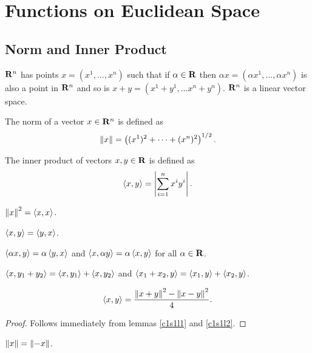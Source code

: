 \chapter{Functions on Euclidean Space}\label{c1}
\section{Norm and Inner Product}\label{c1s1}
$\mathbf{R}^n$ has points $x = (x^1, \ldots, x^n)$ such that if $\alpha \in \mathbf{R}$
then $\alpha x = (\alpha x^1, \ldots, \alpha x^n)$ is also a point in $\mathbf{R}^n$
and so is $x + y = (x^1 + y^1, \ldots x^n + y^n)$. $\mathbf{R}^n$ is a linear vector
space. 
\begin{defn}\label{c1s1d1}
The norm of a vector $x \in \mathbf{R}^n$ is defined as
\[
\left\Vert{x}\right\Vert = \left((x^1)^2 + \cdots + (x^n)^2\right)^{1/2}.
\]
\end{defn}

\begin{defn}\label{c1s1d2}
The inner product of vectors $x, y \in \mathbf{R}$ is defined as
\[
\left\langle{x, y}\right\rangle = \left\vert{\sum_{i=1}^n x^i y^i }\right\vert.
\]
\end{defn}

\begin{lem}\label{c1s1l1}
$\left\Vert{x}\right\Vert^2 = \left\langle{x, x}\right\rangle$.
\end{lem}

\begin{lem}\label{c1s1l2}
$\left\langle{x, y}\right\rangle = \left\langle{y, x}\right\rangle$.
\end{lem}

\begin{lem}\label{c1s1l3}
$\left\langle{\alpha x, y}\right\rangle = \alpha\left\langle{y, x}\right\rangle$ and $\left\langle{x, \alpha y}\right\rangle = \alpha\left\langle{x, y}\right\rangle$
for all $\alpha \in \mathbf{R}$.
\end{lem}

\begin{lem}\label{c1s1l4}
$\left\langle{x, y_1 + y_2}\right\rangle = \left\langle{x, y_1}\right\rangle + \left\langle{x, y_2}\right\rangle$ and $\left\langle{x_1 + x_2, y}\right\rangle = 
\left\langle{x_1, y}\right\rangle + \left\langle{x_2, y}\right\rangle$.
\end{lem}

\begin{lem}\label{c1s1l5}
\[
\left\langle{x, y}\right\rangle = \frac{\left\Vert{x + y}\right\Vert^2 - \left\Vert{x - y}\right\Vert^2}{4}.
\]
\end{lem}
\begin{proof}
Follows immediately from lemmas \ref{c1s1l1} and \ref{c1s1l2}.
\end{proof}

\begin{lem}\label{c1s1l6}
$\left\Vert{x}\right\Vert = \left\Vert{-x}\right\Vert$.
\end{lem}


